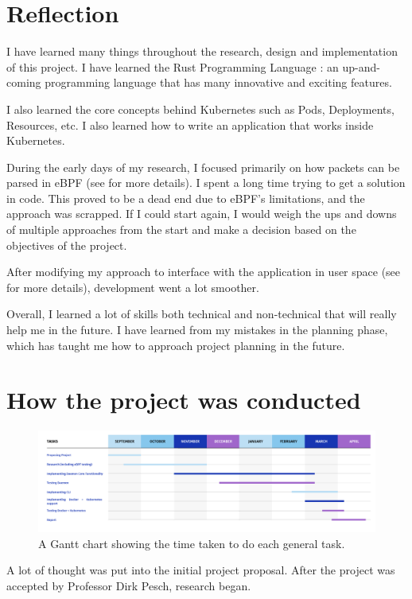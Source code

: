 \documentclass[a4paper,12pt]{report}
\begin{document}
\section{Reflection}
I have learned many things throughout the research, design and implementation of this project.
I have learned the Rust Programming Language \cite{rust}: an up-and-coming programming language that has many innovative and exciting features.

I also learned the core concepts behind Kubernetes \cite{k8s} such as Pods, Deployments, Resources, etc. I also learned how to write an application
that works inside Kubernetes.

During the early days of my research, I focused primarily on how packets can be parsed in eBPF \cite{ebpf} (see  for more details).
I spent a long time trying to get a solution in code.
This proved to be a dead end due to eBPF's limitations, and the approach was scrapped. 
If I could start again, I would weigh the ups and downs of multiple approaches from the start and make a decision based on the objectives of the project.

After modifying my approach to interface with the application in user space (see \textit{} for more details), development went a lot smoother.

Overall, I learned a lot of skills both technical and non-technical that will really help me in the future. I have learned from my mistakes in the planning phase, which has taught me how to approach project planning in the future.

\newpage
\section{How the project was conducted}
\begin{figure}[hbt!]
    \centering
    \includegraphics[width=\linewidth]{gantt.png}
    \caption{A Gantt chart showing the time taken to do each general task.}
\end{figure}

A lot of thought was put into the initial project proposal. After the project was accepted by Professor Dirk Pesch, research began.
\end{document}
